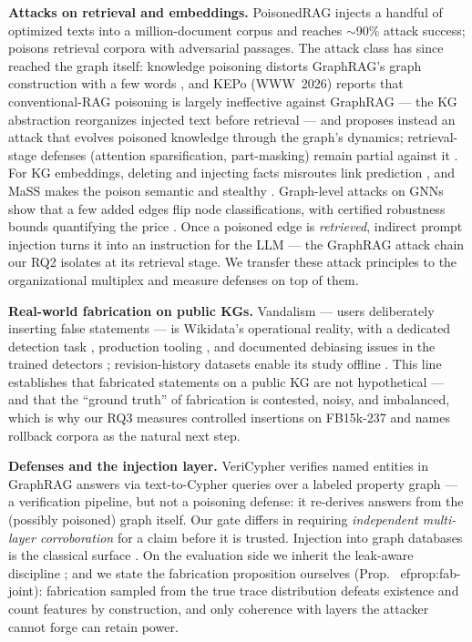 \documentclass[conference]{IEEEtran}
\begin{document}
\textbf{Attacks on retrieval and embeddings.} PoisonedRAG
\cite{zou2024poisonedrag} injects a handful of optimized texts into a
million-document corpus and reaches $\sim$90\% attack success;
\cite{zhong2023poisoning} poisons retrieval corpora with adversarial
passages. The attack class has since reached the graph itself: knowledge
poisoning distorts GraphRAG's graph construction with a few words
\cite{wen2025fewwords}, and KEPo (WWW~2026) \cite{kepo2026} reports that
conventional-RAG poisoning is largely ineffective against GraphRAG ---
the KG abstraction reorganizes injected text before retrieval --- and
proposes instead an attack that evolves poisoned knowledge through the
graph's dynamics; retrieval-stage defenses (attention
spar\-sification, part-masking) remain partial against it
\cite{cheng2025securerag,pathmanathan2025ragpart}. For KG embeddings,
deleting and injecting facts misroutes link prediction
\cite{zhang2019poisoning}, and MaSS makes the poison semantic and
stealthy \cite{you2023mass}. Graph-level attacks on GNNs
\cite{sun2019adversarial,zugner2018adversarial,zugner2019adversarial}
show that a few added edges flip node classifications, with certified
robustness bounds quantifying the price \cite{wang2021certified}.
Once a poisoned edge is \emph{retrieved}, indirect prompt injection
turns it into an instruction for the LLM \cite{greshake2023not} --- the
GraphRAG attack chain our RQ2 isolates at its retrieval stage. We
transfer these attack principles to the organizational multiplex and
measure defenses on top of them.

\textbf{Real-world fabrication on public KGs.} Vandalism --- users
deliberately inserting false statements --- is Wikidata's operational
reality, with a dedicated detection task \cite{heindorf2017wsdmcup},
production tooling \cite{sarabadani2017tools}, and documented
debiasing issues in the trained detectors \cite{heindorf2019debiasing};
revision-history datasets enable its study offline
\cite{schmelzeisen2022wikidated}. This line establishes that fabricated
statements on a public KG are not hypothetical --- and that the
``ground truth'' of fabrication is contested, noisy, and imbalanced,
which is why our RQ3 measures controlled insertions on FB15k-237 and
names rollback corpora \cite{schmelzeisen2022wikidated} as the natural
next step.

\textbf{Defenses and the injection layer.} VeriCypher
\cite{gusarov2025veritycypher} verifies named entities in GraphRAG answers
via text-to-Cypher queries over a labeled property graph --- a verification
pipeline, but not a poisoning defense: it re-derives answers from the
(possibly poisoned) graph itself. Our gate differs in requiring
\emph{independent multi-layer corroboration} for a claim before it is
trusted. Injection into graph databases is the classical surface
\cite{ron2015nosql}. On the evaluation side we inherit the leak-aware
discipline \cite{arp2022dos,pendlebury2019tesseract}; and we state the
fabrication proposition ourselves
(Prop.~
ef{prop:fab-joint}): fabrication sampled from the true trace
distribution defeats existence and count features by construction, and only
coherence with layers the attacker cannot forge can retain power.
\end{document}
